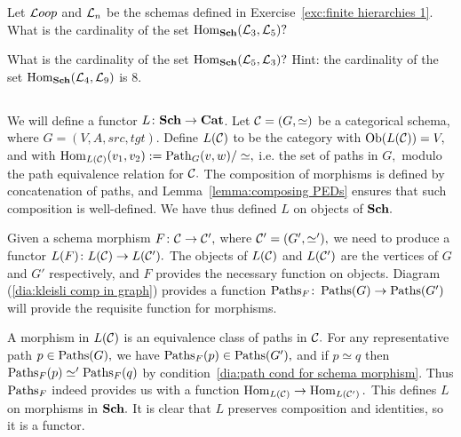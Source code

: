 \documentclass[../main/CT4S-EN-RU]{subfiles}
\begin{document}
\begin{exerciseRUS}\label{exc:finite hierarchies 1}
\end{exerciseRUS}

\begin{exerciseENG}
Let ${\mathcal{L} oop}$ and $\mathcal{L}_n$ be the schemas defined in Exercise~\ref{exc:finite hierarchies 1}.
\sexc What is the cardinality of the set $\operatorname{Hom}_{\mathbf{Sch}}(\mathcal{L}_3,\mathcal{L}_5)?$
\item What is the cardinality of the set $\operatorname{Hom}_{\mathbf{Sch}}(\mathcal{L}_5,\mathcal{L}_3)?$ Hint: the cardinality of the set $\operatorname{Hom}_{\mathbf{Sch}}(\mathcal{L}_4,\mathcal{L}_9)$ is 8.
\endsexc
\end{exerciseENG}

\begin{exerciseRUS}
\end{exerciseRUS}


\subsection{}\label{sec:proof of cat=sch}

\begin{constructionENG}
We will define a functor $L\colon{\mathbf{Sch}}\rightarrow{\mathbf{Cat}}$. Let $\mathcal{C}=(G,\simeq)$ be a categorical schema, where $G=(V,A,src,tgt).$ Define $L(\mathcal{C})$ to be the category with $\operatorname{Ob}(L(\mathcal{C}))=V,$ and with $\operatorname{Hom}_{L(\mathcal{C})}(v_1,v_2):=\operatorname{Path}_G(v,w)/\simeq,$ i.e. the set of paths in $G,$ modulo the path equivalence relation for $\mathcal{C}.$ The composition of morphisms is defined by concatenation of paths, and Lemma~\ref{lemma:composing PEDs} ensures that such composition is well-defined. We have thus defined $L$ on objects of ${\mathbf{Sch}}.$

Given a schema morphism $F\colon\mathcal{C}\rightarrow\mathcal{C}',$ where $\mathcal{C}'=(G',\simeq'),$ we need to produce a functor $L(F)\colon L(\mathcal{C})\rightarrow L(\mathcal{C}').$ The objects of $L(\mathcal{C})$ and $L(\mathcal{C}')$ are the vertices of $G$ and $G'$ respectively, and $F$ provides the necessary function on objects. Diagram (\ref{dia:kleisli comp in graph}) provides a function $\operatorname{Paths}_F\colon\operatorname{Paths}(G)\rightarrow\operatorname{Paths}(G')$ will provide the requisite function for morphisms. 

A morphism in $L(\mathcal{C})$ is an equivalence class of paths in $\mathcal{C}.$ For any representative path $p\in\operatorname{Paths}(G),$ we have $\operatorname{Paths}_F(p)\in\operatorname{Paths}(G'),$ and if $p\simeq q$ then $\operatorname{Paths}_F(p)\simeq'\operatorname{Paths}_F(q)$ by condition~\ref{dia:path cond for schema morphism}. Thus $\operatorname{Paths}_F$ indeed provides us with a function $\operatorname{Hom}_{L(\mathcal{C})}\rightarrow\operatorname{Hom}_{L(\mathcal{C}')}.$ This defines $L$ on morphisms in ${\mathbf{Sch}}.$ It is clear that $L$ preserves composition and identities, so it is a functor.
\end{constructionENG}
\end{document}
